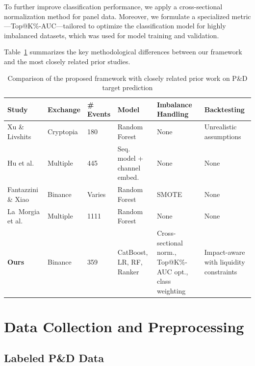 \documentclass{ieeeaccess}
\begin{document}
To further improve classification performance, we apply a cross-sectional normalization method for panel data. Moreover, we formulate a specialized metric---Top@K\%-AUC---tailored to optimize the classification model for highly imbalanced datasets, which was used for model training and validation.

Table~\ref{table:comparison_prior_work} summarizes the key methodological differences between our framework and the most closely related prior studies.

\begin{table}[!t]
    \centering
    \small
    \renewcommand{\arraystretch}{1.3}
    \setlength{\tabcolsep}{5pt}
    \caption{Comparison of the proposed framework with closely related prior work on P\&D target prediction}
    \begin{tabular}{p{2.8cm}p{2.2cm}p{2cm}p{2.2cm}p{2.5cm}p{2.5cm}}
        \toprule
        \textbf{Study} & \textbf{Exchange} & \textbf{\# Events} & \textbf{Model} & \textbf{Imbalance Handling} & \textbf{Backtesting} \\
        \midrule
        Xu \& Livshits~\cite{pd_anatomy} & Cryptopia & 180 & Random Forest & None & Unrealistic assumptions \\
        Hu et al.~\cite{hu2023sequence} & Multiple & 445 & Seq. model + channel embed. & None & None \\
        Fantazzini \& Xiao~\cite{econometrics11030022} & Binance & Varies & Random Forest & SMOTE & None \\
        La~Morgia et al.~\cite{la_morgia_pump_2020} & Multiple & 1111 & Random Forest & None & None \\
        \textbf{Ours} & Binance & 359 & CatBoost, LR, RF, Ranker & Cross-sectional norm., Top@K\%-AUC opt., class weighting & Impact-aware with liquidity constraints \\
        \bottomrule
    \end{tabular}
    \label{table:comparison_prior_work}
\end{table}



\section{Data Collection and Preprocessing}

\subsection{Labeled P\&D Data}
\label{section:pump_and_dump_data}
\end{document}
